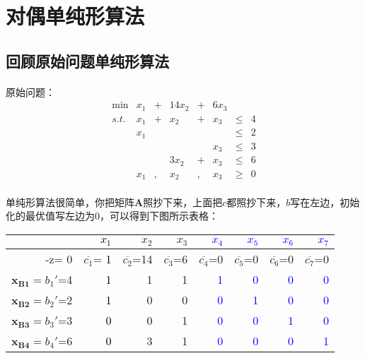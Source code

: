 	\section{对偶单纯形算法}
	\subsection{回顾原始问题单纯形算法}
		\paragraph{}原始问题：
			\[
			\begin{array}{rrrrrrrrrrrrl}
 				\min &  x_1     &+&  14 x_2    &+& 6 x_3 \\
 				s.t. &   x_1     &+&     x_2    &+& x_3 & \leq & 4   \\
      				 &   x_1     & &            & &     & \leq & 2   \\
      				 &           & &            & &  x_3& \leq & 3   \\
      				 &           & &   3x_2     &+&  x_3& \leq & 6   \\
      				 &   x_1     &,&   x_2      &,&  x_3& \geq & 0   
			\end{array} \nonumber
			\]
		\paragraph{}单纯形算法很简单，你把矩阵$\mathbf{A}$照抄下来，上面把$c$都照抄下来，$b$写在左边，初始化的最优值写左边为0，可以得到下图所示表格：
				\begin{table}[h]
				\centering
\begin{tabular}{r|rrrrrrr}\hline
  & \textcolor{black}{$x_1$} & $x_2$ & $x_3$ & \textcolor{blue}{$x_4$} & \textcolor{blue}{$x_5$} & \textcolor{blue}{$x_6$} & \textcolor{blue}{$x_7$}\\
\hline
 -z= 0 & $\overline{c_1}$= \textcolor{black}{1}  & $\overline{c_2}$=14 & $\overline{c_3}$=6 & $\overline{c_4}$=0 & $\overline{c_5}$=0 & $\overline{c_6}$=0 & $\overline{c_7}$=0 \\
 \hline
 $\mathbf{x_{B1}} = b_1'$=4 & \textcolor{black}{1} & 1 & 1 & \textcolor{blue}{1} & \textcolor{blue}{0} & \textcolor{blue}{0} & \textcolor{blue}{0} \\
 $\mathbf{x_{B2}} = b_2'$=2 & \textcolor{black}{1} & 0 & 0 & \textcolor{blue}{0} & \textcolor{blue}{1} & \textcolor{blue}{0} & \textcolor{blue}{0} \\
 $\mathbf{x_{B3}} = b_3'$=3 & \textcolor{black}{0} & 0 & 1 & \textcolor{blue}{0} & \textcolor{blue}{0} & \textcolor{blue}{1} & \textcolor{blue}{0} \\
 $\mathbf{x_{B4}} = b_4'$=6 & \textcolor{black}{0} & 3 & 1 & \textcolor{blue}{0} & \textcolor{blue}{0} & \textcolor{blue}{0} & \textcolor{blue}{1} \\
\hline
\end{tabular}
\end{table}

